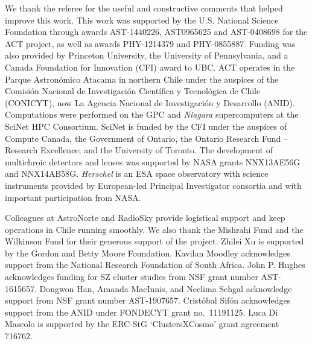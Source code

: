 \documentclass[longauth]{aa} %
\begin{document}
\begin{acknowledgements}
      We thank the referee for the useful and constructive comments that helped improve this work.
      This work was supported by the U.S. National Science Foundation through awards AST-1440226, AST0965625 and AST-0408698 for the ACT project, as well as awards PHY-1214379 and PHY-0855887. Funding was also provided by Princeton University, the University of Pennsylvania, and a Canada Foundation for Innovation (CFI) award to UBC. ACT operates in the Parque Astron\'{o}mico Atacama in northern Chile under the auspices of the Comisi\'{o}n Nacional de Investigaci\'{o}n Cient\'{i}fica y Tecnol\'{o}gica de Chile (CONICYT), now La Agencia Nacional de Investigaci\'{o}n y Desarrollo (ANID). Computations were performed on the GPC and \emph{Niagara} supercomputers at the SciNet HPC Consortium. SciNet is funded by the CFI under the auspices of Compute Canada, the Government of Ontario, the Ontario Research Fund -- Research Excellence; and the University of Toronto. The development of multichroic detectors and lenses was supported by NASA grants NNX13AE56G and NNX14AB58G.   
      {\it Herschel} is an ESA space observatory with science instruments provided by European-led Principal Investigator consortia and with important participation from NASA.
      
      Colleagues at AstroNorte and RadioSky provide logistical support and keep operations in Chile running smoothly. We also thank the Mishrahi Fund and the Wilkinson Fund for their generous support of the project. Zhilei Xu is supported by the Gordon and Betty Moore Foundation. Kavilan Moodley acknowledges support from the National Research Foundation of South Africa. John P. Hughes acknowledges funding for SZ cluster studies from NSF grant number AST-1615657. Dongwon Han, Amanda MacInnis, and Neelima Sehgal acknowledge support from NSF grant number AST-1907657. Crist\'obal Sif\'on acknowledges support from the ANID under FONDECYT grant no.\ 11191125. Luca Di Mascolo is supported by the ERC-StG `ClustersXCosmo' grant agreement 716762.
\end{acknowledgements}




\appendix
\end{document}

